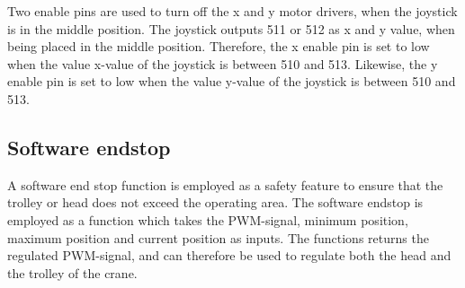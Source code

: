 Two enable pins are used to turn off the x and y motor drivers, when the joystick is in the middle position. The joystick outputs 511 or 512 as x and y value, when being placed in the middle position. Therefore, the x enable pin is set to low when the value x-value of the joystick is between 510 and 513. Likewise, the y enable pin is set to low when the value y-value of the joystick is between 510 and 513.

\subsection{Software endstop}

A software end stop function is employed as a safety feature to ensure that the trolley or head does not exceed the operating area. The software endstop is employed as a function which takes the PWM-signal, minimum position, maximum position and current position as inputs. The functions returns the regulated PWM-signal, and can therefore be used to regulate both the head and the trolley of the crane. 

